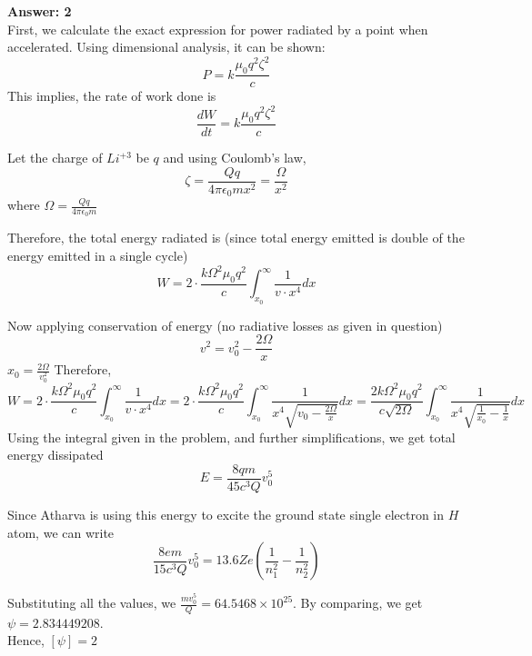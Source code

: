 \documentclass[11pt,a4paper]{scrartcl}
\begin{document}
\begin{solution}
{\Large{\textbf{Answer: 2}}}\\
First, we calculate the exact expression for power radiated by a point when accelerated. Using dimensional analysis, it can be shown: \[P=k \frac{\mu_0 q^2 \zeta^2}{c}
\] This implies, the rate of work done is \[\frac{dW}{dt} = k \frac{\mu_0 q^2 \zeta^2}{c}\]


Let the charge of $Li^{+3} $ be $q$ and using Coulomb's law, \[\zeta =\frac{Qq}{4 \pi \epsilon_0 m x^2 } = \frac{\Omega}{x^2}\] where $\Omega = \frac{Qq}{4 \pi \epsilon_0 m}$

Therefore, the total energy radiated is (since total energy emitted is double of the energy emitted in a single cycle)  \[W = 2 \cdot \frac{k \Omega^2 \mu_0 q^2}{c} \int_{x_0}^{\infty} \frac{1}{v \cdot x^4} dx\]

Now applying conservation of energy (no radiative losses as given in question) \[v^2 = v_{0}^{2} - \frac{2 \Omega}{x}\]
$x_0 = \frac{2 \Omega}{v_{0}^2}$
Therefore,  \[W = 2 \cdot \frac{k \Omega^2 \mu_0 q^2}{c} \int_{x_0}^{\infty} \frac{1}{v \cdot x^4} dx = 2 \cdot \frac{k \Omega^2 \mu_0 q^2}{c} \int_{x_0}^{\infty} \frac{1}{x^4 \sqrt{v_{0} - \frac{2 \Omega}{x}}}dx = \frac{2 k \Omega^2 \mu_0 q^2}{c \sqrt{2 \Omega}} \int_{x_0}^{\infty} \frac{1}{x^4 \sqrt{\frac{1}{x_0} - \frac{1}{x}}} dx\]
Using the integral given in the problem, and further simplifications, we get total energy dissipated  \[E = \frac{8qm}{45 c^3 Q} v_{0}^5\]

Since Atharva is using this energy to excite the ground state single electron in $H$ atom, we can write 
\[\frac{8em}{15 c^3 Q} v_{0}^5 = 13.6 Z e \left( \frac{1}{n_{1}^2} - \frac{1}{n_{2}^2} \right)\]

Substituting all the values, we $\frac{m v_{0}^5}{Q} = 64.5468 \times 10^{25}$.
By comparing, we get $\psi = 2.834449208$. \\
Hence, $[\psi] = 2$ 
\qedsymbol

\end{solution}
\vspace{10mm}%
\end{document}

